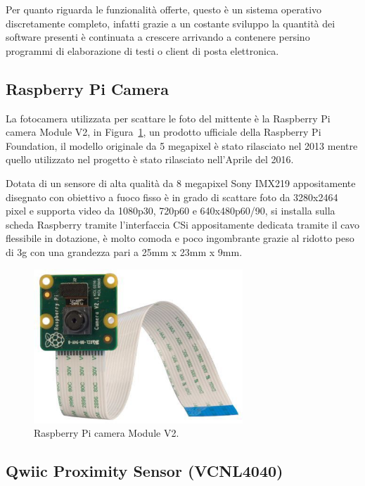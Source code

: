 Per quanto riguarda le funzionalità offerte, questo è un sistema operativo discretamente completo, infatti grazie a un costante sviluppo la quantità dei software 
presenti è continuata a crescere arrivando a contenere persino programmi di elaborazione di testi o client di posta elettronica.


\subsection{Raspberry Pi Camera}
La fotocamera utilizzata per scattare le foto del mittente è la Raspberry Pi camera Module V2, in Figura~\ref{photo_camera}, un prodotto ufficiale della Raspberry Pi 
Foundation, il modello originale da 5 megapixel è stato rilasciato nel 2013 mentre quello utilizzato nel progetto è stato rilasciato nell'Aprile del 2016.

Dotata di un sensore di alta qualità da 8 megapixel Sony IMX219 appositamente disegnato con obiettivo a fuoco fisso è in grado di scattare foto da 3280x2464 pixel e 
supporta video da 1080p30, 720p60 e 640x480p60/90, si installa sulla scheda Raspberry tramite l'interfaccia CSi appositamente dedicata tramite il cavo flessibile in 
dotazione, è molto comoda e poco ingombrante grazie al ridotto peso di 3g con una grandezza pari a 25mm x 23mm x 9mm.
\begin{figure}[htb]
    \centering
    \includegraphics[width=0.7\textwidth]{images/piCamera.png}
    \caption{Raspberry Pi camera Module V2.}
    \label{photo_camera}
\end{figure}


\subsection{Qwiic Proximity Sensor (VCNL4040)}

